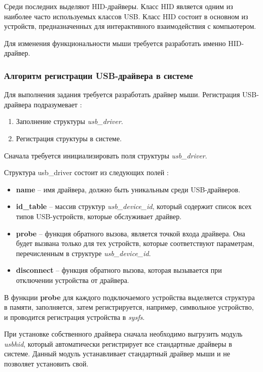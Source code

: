 Среди последних выделяют HID-драйверы. 
Класс HID является одним из наиболее часто используемых классов USB. 
Класс HID состоит в основном из устройств, предназначенных для интерактивного взаимодействия с компьютером. 

Для изменения функциональности мыши требуется разработать именно HID-драйвер.

\subsubsection{Алгоритм регистрации USB-драйвера в системе}
Для выполнения задания требуется разработать драйвер мыши. Регистрация USB-драйвера подразумевает \cite{usb_drivers}:
\begin{enumerate}
	\item Заполнение структуры \textit{usb\_driver}.
	\item Регистрация структуры в системе.
\end{enumerate}

Сначала требуется инициализировать поля структуры \textit{usb\_driver}. 

Структура usb\_driver состоит из следующих полей \cite{usb_driver}:
\begin{itemize}
	\item \textbf{name} -- имя драйвера, должно быть уникальным среди USB-драйверов.
	\item \textbf{id\_table} -- массив структур \textit{usb\_device\_id}, который содержит список всех типов USB-устройств, которые обслуживает драйвер.
	\item \textbf{probe} -- функция обратного вызова, является точкой входа драйвера. Она будет вызвана только для тех устройств, которые соответствуют параметрам, перечисленным в структуре \textit{usb\_device\_id}.
	\item \textbf{disconnect} -- функция обратного вызова, которая вызывается при отключении устройства от драйвера.
\end{itemize}

В функции \textbf{probe} для каждого подключаемого устройства выделяется структура в памяти, заполняется, затем регистрируется, например, символьное устройство, и проводится регистрация устройства в \textit{sysfs}.

При установке собственного драйвера сначала необходимо выгрузить модуль \textit{usbhid}, который автоматически регистрирует все стандартные драйверы в системе.
Данный модуль устанавливает стандартный драйвер мыши и не позволяет установить свой.

